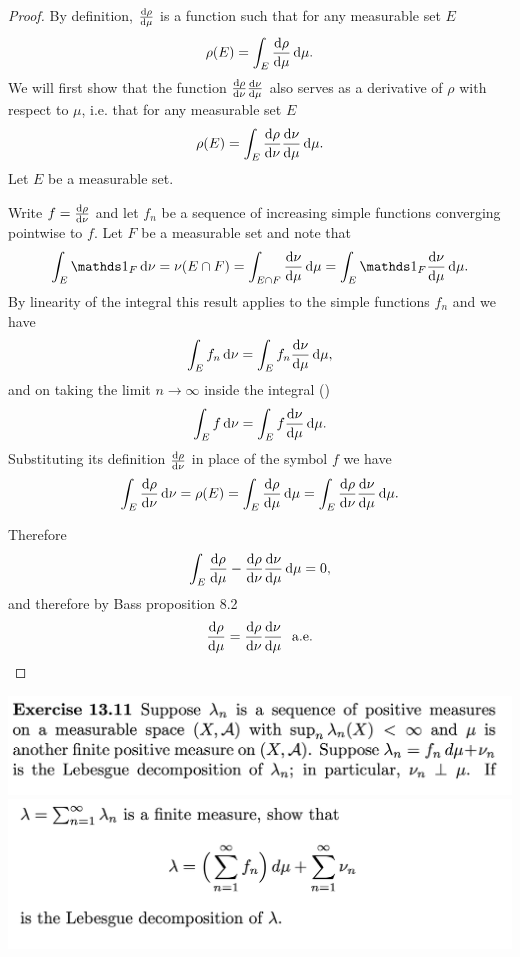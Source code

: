 \begin{proof}
  By definition, $\frac{\d\rho}{\d\mu}$ is a function such that for any measurable set $E$
  \begin{align*}
    \rho(E) = \int_E \frac{\d\rho}{\d\mu} \d\mu.
  \end{align*}
  We will first show that the function $\frac{\d\rho}{\d\nu}\frac{\d\nu}{\d\mu}$ also serves as a derivative
  of $\rho$ with respect to $\mu$, i.e. that for any measurable set $E$
  \begin{align*}
    \rho(E) = \int_E \frac{\d\rho}{\d\nu}\frac{\d\nu}{\d\mu} \d\mu.
  \end{align*}
  Let $E$ be a measurable set.

  Write $f = \frac{\d\rho}{\d\nu}$ and let $f_n$ be a sequence of increasing simple functions converging
  pointwise to $f$. Let $F$ be a measurable set and note that
  \begin{align*}
    \int_E \ind_F \d\nu
    = \nu(E \cap F)
    = \int_{E \cap F} \frac{\d\nu}{\d\mu} \d\mu
    = \int_E \ind_F \frac{\d\nu}{\d\mu} \d\mu.
  \end{align*}
  By linearity of the integral this result applies to the simple functions $f_n$ and we have
  \begin{align*}
    \int_E f_n \d\nu = \int_{E} f_n \frac{\d\nu}{\d\mu}\d\mu,
  \end{align*}
  and on taking the limit $n \to \infty$ inside the integral ()
  \begin{align*}
    \int_E f \d\nu = \int_{E} f \frac{\d\nu}{\d\mu}\d\mu.
  \end{align*}
  Substituting its definition $\frac{\d\rho}{\d\nu}$ in place of the symbol $f$ we have
  \begin{align*}
    \int_E \frac{\d\rho}{\d\nu} \d\nu
    = \rho(E)
    = \int_E \frac{\d\rho}{\d\mu} \d\mu
    = \int_{E} \frac{\d\rho}{\d\nu} \frac{\d\nu}{\d\mu}\d\mu.
  \end{align*}

  Therefore
  \begin{align*}
    \int_E \frac{\d\rho}{\d\mu}  - \frac{\d\rho}{\d\nu}\frac{\d\nu}{\d\mu} \d\mu = 0,
  \end{align*}
  and therefore by Bass proposition 8.2
  \begin{align*}
    \frac{\d\rho}{\d\mu} = \frac{\d\rho}{\d\nu}\frac{\d\nu}{\d\mu} \ae
  \end{align*}
\end{proof}

\begin{mdframed}
\includegraphics[width=400pt]{img/analysis--berkeley-202a-hw11-c5a4.png}
\includegraphics[width=400pt]{img/analysis--berkeley-202a-hw11-3974.png}
\end{mdframed}